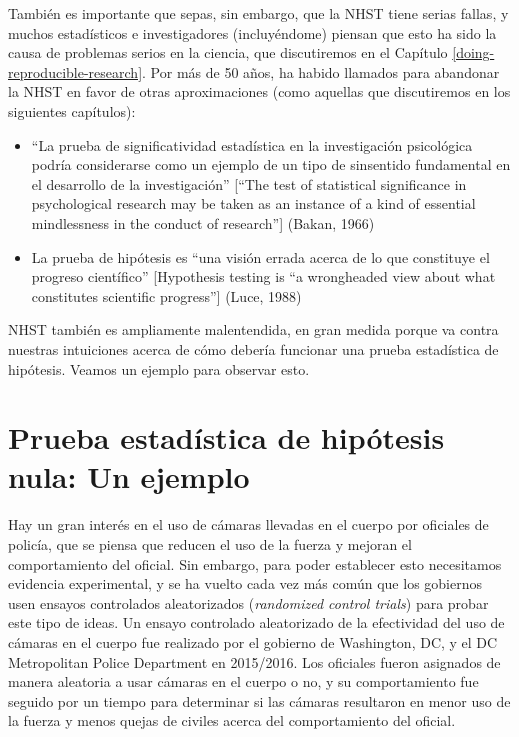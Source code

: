 \documentclass[
  12pt,
]{book}
\providecommand{\tightlist}{%
  \setlength{\itemsep}{0pt}\setlength{\parskip}{0pt}}
\begin{document}
También es importante que sepas, sin embargo, que la NHST tiene serias fallas, y muchos estadísticos e investigadores (incluyéndome) piensan que esto ha sido la causa de problemas serios en la ciencia, que discutiremos en el Capítulo \ref{doing-reproducible-research}. Por más de 50 años, ha habido llamados para abandonar la NHST en favor de otras aproximaciones (como aquellas que discutiremos en los siguientes capítulos):

\begin{itemize}
\tightlist
\item
  ``La prueba de significatividad estadística en la investigación psicológica podría considerarse como un ejemplo de un tipo de sinsentido fundamental en el desarrollo de la investigación'' {[}``The test of statistical significance in psychological research may be taken as an instance of a kind of essential mindlessness in the conduct of research''{]} (Bakan, 1966)
\item
  La prueba de hipótesis es ``una visión errada acerca de lo que constituye el progreso científico'' {[}Hypothesis testing is ``a wrongheaded view about what constitutes scientific progress''{]} (Luce, 1988)
\end{itemize}

NHST también es ampliamente malentendida, en gran medida porque va contra nuestras intuiciones acerca de cómo debería funcionar una prueba estadística de hipótesis. Veamos un ejemplo para observar esto.

\hypertarget{prueba-estaduxedstica-de-hipuxf3tesis-nula-un-ejemplo}{%
\section{Prueba estadística de hipótesis nula: Un ejemplo}\label{prueba-estaduxedstica-de-hipuxf3tesis-nula-un-ejemplo}}

Hay un gran interés en el uso de cámaras llevadas en el cuerpo por oficiales de policía, que se piensa que reducen el uso de la fuerza y mejoran el comportamiento del oficial. Sin embargo, para poder establecer esto necesitamos evidencia experimental, y se ha vuelto cada vez más común que los gobiernos usen ensayos controlados aleatorizados (\emph{randomized control trials}) para probar este tipo de ideas. Un ensayo controlado aleatorizado de la efectividad del uso de cámaras en el cuerpo fue realizado por el gobierno de Washington, DC, y el DC Metropolitan Police Department en 2015/2016. Los oficiales fueron asignados de manera aleatoria a usar cámaras en el cuerpo o no, y su comportamiento fue seguido por un tiempo para determinar si las cámaras resultaron en menor uso de la fuerza y menos quejas de civiles acerca del comportamiento del oficial.
\end{document}
